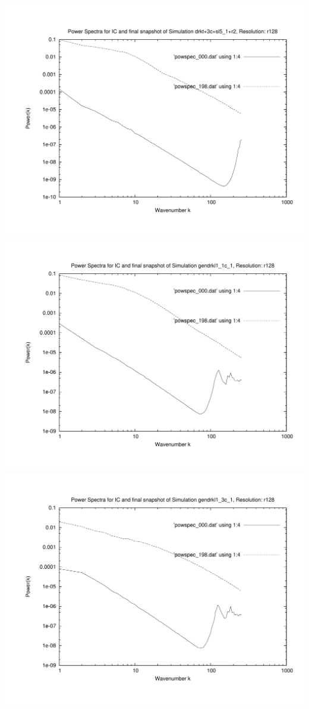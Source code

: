 \newpage

\includegraphics[scale=0.5]{r128/drkt+3c+sl5_1+r2/plot_powspec_drkt+3c+sl5_1+r2.pdf}
\includegraphics[scale=0.5]{r128/gendrkl1_1c_1/plot_powspec_gendrkl1_1c_1.pdf}
\includegraphics[scale=0.5]{r128/gendrkl1_3c_1/plot_powspec_gendrkl1_3c_1.pdf}